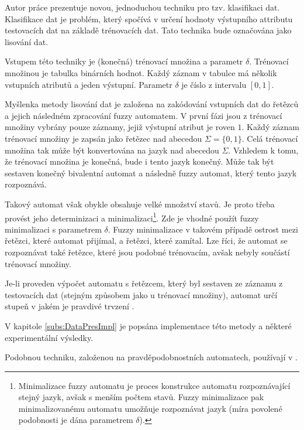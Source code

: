 Autor práce prezentuje novou, jednoduchou techniku pro tzv. klasifikaci dat. Klasifikace dat je problém, který spočívá v určení hodnoty výstupního attributu testovacích dat na základě trénovacích dat. Tato technika bude označována jako lisování dat.

Vstupem této techniky je (konečná) trénovací množina a parametr $\delta$. Trénovací množinou je tabulka binárních hodnot. Každý záznam v tabulce má několik vstupních atributů a jeden výstupní. Parametr $\delta$ je číslo z intervalu $[0,1]$.

Myšlenka metody lisování dat je založena na zakódování vstupních dat do řetězců a jejich následném zpracování fuzzy automatem. V první fázi jsou z trénovací množiny vybrány pouze záznamy, jejiž výstupní atribut je roven $1$. Každý záznam trénovací množiny je zapsán jako řetězec nad abecedou $\Sigma = \{ 0, 1 \}$. Celá trénovací množina tak může být konvertována na jazyk nad abecedou $\Sigma$. Vzhledem k tomu, že trénovací množina je konečná, bude i tento jazyk konečný. Může tak být sestaven konečný bivalentní automat a následně fuzzy automat, který tento jazyk rozpoznává.

Takový automat však obykle obsahuje velké množství stavů. Je proto třeba provést jeho determinizaci a minimalizaci\footnote{Minimalizace fuzzy automatu je proces konstrukce automatu rozpoznávající stejný jazyk, avšak s menším počtem stavů. Fuzzy minimalizace pak minimalizovanému automatu umožňuje rozpoznávat jazyk  (míra povolené podobnosti je dána parametrem $\delta$).}. Zde je vhodné použít fuzzy minimalizaci s parametrem $\delta$. Fuzzy minimalizace v takovém případě  ostrost mezi řetězci, které automat přijímal, a řetězci, které zamítal. Lze říci, že automat se  rozpoznávat také řetězce, které jsou podobné trénovacím, avšak nebyly součástí trénovací množiny.

Je-li proveden výpočet automatu s řetězcem, který byl sestaven ze záznamu z testovacích dat (stejným způsobem jako u trénovací množiny), automat určí stupeň v jakém je pravdivé trvzení .

V kapitole \ref{subs:DataPresImpl} je popsána implementace této metody a některé experimentální výsledky.
\begin{note}
  Podobnou techniku, založenou na pravděpodobnostních automatech, používají v \cite{Hac+-ProAnaLarFinStaMac}.
\end{note}


